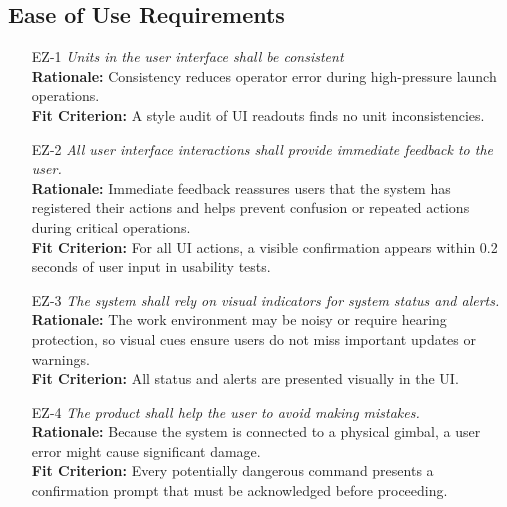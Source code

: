 \documentclass[12pt]{article}
\begin{document}
\subsection{Ease of Use Requirements}
\begin{itemize}[leftmargin=*]
  \item[EZ-1] \emph{Units in the user interface shall be consistent}\\[2mm]
        \textbf{Rationale:} Consistency reduces operator error during high-pressure launch operations.\\
        \textbf{Fit Criterion:} A style audit of UI readouts finds no unit inconsistencies.

  \item[EZ-2] \emph{All user interface interactions shall provide immediate feedback to
          the user.}\\[2mm]
        \textbf{Rationale:} Immediate feedback reassures users that the system has registered their actions and helps prevent confusion or repeated actions during critical operations.\\
        \textbf{Fit Criterion:} For all UI actions, a visible confirmation appears within 0.2 seconds of user input in usability tests.

  \item[EZ-3] \emph{The system shall rely on visual indicators for system status and
          alerts.}\\[2mm]
        \textbf{Rationale:} The work environment may be noisy or require hearing protection, so visual cues ensure users do not miss important updates or warnings.\\
        \textbf{Fit Criterion:} All status and alerts are presented visually in the UI.
  \item[EZ-4] \emph{The product shall help the user to avoid making mistakes.}\\[2mm]
        \textbf{Rationale:} Because the system is connected to a physical gimbal, a user error might cause significant damage.\\
        \textbf{Fit Criterion:} Every potentially dangerous command presents a confirmation prompt that must be acknowledged before proceeding.
\end{itemize}
\end{document}
